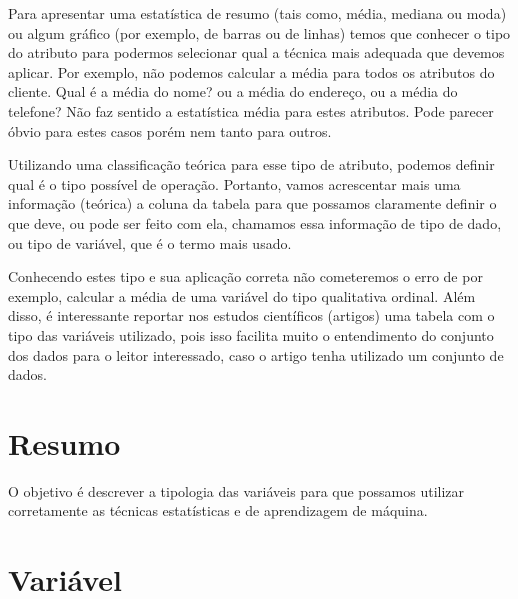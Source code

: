 

Para apresentar uma estatística de resumo (tais como, média, mediana ou moda) ou algum gráfico (por exemplo, de barras ou de linhas) temos que conhecer o tipo do atributo para podermos selecionar qual a técnica mais adequada que devemos aplicar. Por exemplo, não podemos calcular a média para todos os atributos do cliente. Qual é a média do nome? ou a média do endereço, ou a média do telefone? Não faz sentido a estatística média para estes atributos. Pode parecer óbvio para estes casos porém nem tanto para outros.

Utilizando uma classificação teórica para esse tipo de atributo, podemos definir qual é o tipo possível de operação. Portanto, vamos acrescentar mais uma informação (teórica) a coluna da tabela para que possamos claramente definir o que deve, ou pode ser feito com ela, chamamos essa informação de tipo de dado, ou tipo de variável, que é o termo mais usado.

Conhecendo estes tipo e sua aplicação correta não cometeremos o erro de por exemplo, calcular a média de uma variável do tipo qualitativa ordinal. Além disso, é interessante reportar nos estudos científicos (artigos) uma tabela com o tipo das variáveis utilizado, pois isso facilita muito o entendimento do conjunto dos dados para o leitor interessado, caso o artigo tenha utilizado um conjunto de dados.

\section{Resumo}

\begin{tcolorbox}
O objetivo é descrever a tipologia das variáveis para que possamos utilizar corretamente as técnicas estatísticas e de aprendizagem de máquina.
\end{tcolorbox}

\newpage

\section{Variável}

